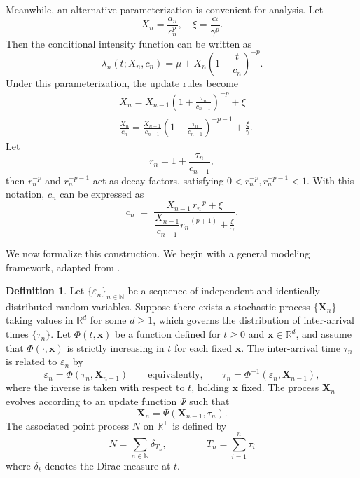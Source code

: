 \documentclass[11pt]{article}
\theoremstyle{definition}
\newtheorem{definition}{Definition}
\begin{document}
Meanwhile, an alternative parameterization is convenient for analysis.
Let
$$ X_n = \frac{a_n}{c_n^p}, \quad \xi = \frac{\alpha}{\gamma^p}.$$
Then the conditional intensity function can be written as
\begin{equation}
\lambda_n(t; X_n, c_n) = \mu + X_n \left(1 + \frac{t}{c_n} \right)^{-p}. \label{eq:intensity2}
\end{equation}
Under this parameterization, the update rules become
\begin{align*}
	&X_n = X_{n-1} \left(1  + \frac{\tau_n}{c_{n-1}} \right)^{-p} + \xi \\
	&\frac{X_n}{c_n} = \frac{X_{n-1}}{c_{n-1}} \left(1  + \frac{\tau_n}{c_{n-1}} \right)^{-p-1} + \frac{\xi}{\gamma}.
\end{align*}
Let
$$r_n = 1 + \frac{\tau_n}{c_{n-1}},$$
then $r_n^{-p}$ and  $r_n^{-p-1}$ act as decay factors, satisfying
$0 < r_n^{-p}, r_n^{-p-1} < 1$.
With this notation, $c_n$ can be expressed as
$$
c_n
\;=\;
\frac{X_{n-1}\,r_n^{-p} + \xi}{\dfrac{X_{n-1}}{c_{n-1}}r_n^{-(p+1)} + \frac{\xi}{\gamma} }.
$$

We now formalize this construction.
We begin with a general modeling framework, adapted from \cite{lee2025self}.

\begin{definition}\label{Def:general_vector}
	Let $\{ \varepsilon_n \}_{n \in \mathbb{N}}$ be a sequence of independent and identically distributed random variables. 
	Suppose there exists a stochastic process $\{ \mathbf{X}_n \}$ taking values in $\mathbb{R}^d$ for some $d \ge 1$, which governs the distribution of inter-arrival times $\{ \tau_n \}$.
	Let \(\Phi(t,\mathbf{x})\) be a function defined for \(t \ge 0\) and \(\mathbf{x} \in \mathbb{R}^d\), and assume that \(\Phi(\cdot,\mathbf{x})\) is strictly increasing in \(t\) for each fixed \(\mathbf{x}\).
	The inter-arrival time \(\tau_n\) is related to \(\varepsilon_n\) by
	\begin{equation}
		\varepsilon_n = \Phi(\tau_n, \mathbf{X}_{n-1}) 
		\qquad \text{equivalently,} \qquad
		\tau_n = \Phi^{-1}(\varepsilon_n, \mathbf{X}_{n-1}) ,
		\label{Eq:tau_vector}
	\end{equation}
	where the inverse is taken with respect to $t$, holding $\mathbf{x}$ fixed.
	The process $\mathbf{X}_n$ evolves according to an update function $\Psi$ such that
	\begin{equation}
		\mathbf{X}_n = \Psi(\mathbf{X}_{n-1}, \tau_n). \label{Eq:Psi0}
	\end{equation}
	The associated point process \(N\) on \(\mathbb{R}^+\) is defined by
	\[
	N = \sum_{n \in \mathbb N} \delta_{T_n}, 
	\qquad  \qquad 
	T_n = \sum_{i=1}^n \tau_i
	\]
	where \(\delta_t\) denotes the Dirac measure at \(t\).
\end{definition}
\end{document}
